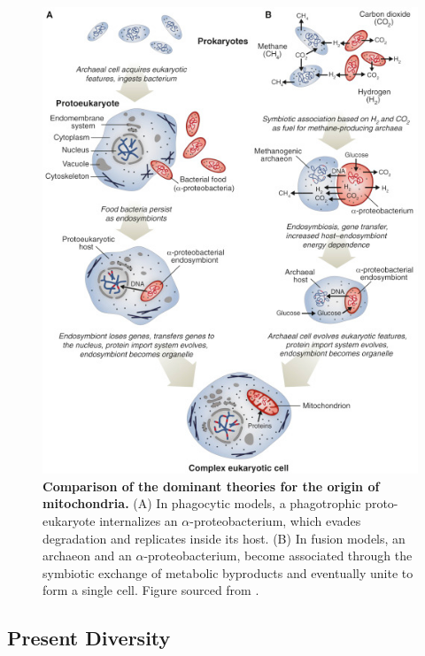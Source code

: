 \documentclass[12pt,twoside]{reedthesis}
\begin{document}
\begin{figure}[h]
    \begin{center}
        \includegraphics[scale=1]{../figures/origin_mitochondria.jpg}
    \end{center}
    \caption[Comparison of the dominant theories for the origin of mitochondria]{\textbf{Comparison of the dominant theories for the origin of mitochondria.} (A) In phagocytic models, a phagotrophic proto-eukaryote internalizes an $\alpha$-proteobacterium, which evades degradation and replicates inside its host. (B) In fusion models, an archaeon and an $\alpha$-proteobacterium, become associated through the symbiotic exchange of metabolic byproducts and eventually unite to form a single cell. Figure sourced from \citealp{archibald_endosymbiosis_2015}.}
    \label{origin_mitochondria}
\end{figure}

\subsection{Present Diversity}
\end{document}
